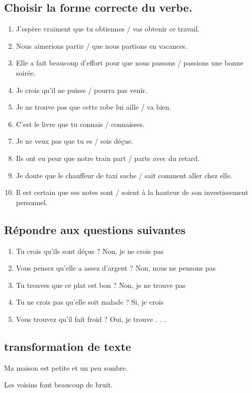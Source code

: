 \documentclass[12pt]{article}
\begin{document}
\subsection{Choisir la forme correcte du verbe.}
\begin{enumerate}
	\item J’espère vraiment que tu obtiennes / vas obtenir ce travail.
	\item Nous aimerions partir / que nous partions en vacances.
	\item Elle a fait beaucoup d’effort pour que nous passons / passions une bonne soirée.
	\item Je crois qu’il ne puisse / pourra pas venir.
	\item Je ne trouve pas que cette robe lui aille / va bien.
	\item C’est le livre que tu connais / connaisses.
	\item Je ne veux pas que tu es / sois déçue.
	\item Ils ont eu peur que notre train part / parte avec du retard.
	\item Je doute que le chauffeur de taxi sache / sait comment aller chez elle.
	\item Il est certain que ses notes sont / soient à la hauteur de son investissement personnel.
\end{enumerate}
	\subsection{Répondre aux questions suivantes}

\begin{enumerate}
	\item Tu crois qu’ils sont déçus ? Non, je ne crois pas 
	\item Vous pensez qu’elle a assez d’argent ? Non, nous ne pensons pas
	\item Tu trouves que ce plat est bon ? Non, je ne trouve pas 
	\item Tu ne crois pas qu’elle soit malade ? Si, je crois 
	\item Vous trouvez qu’il fait froid ? Oui, je trouve . . .
\end{enumerate}
	\subsection{transformation de texte}
Ma maison est petite et un peu sombre.


Les voisins font beaucoup de bruit.
\end{document}
